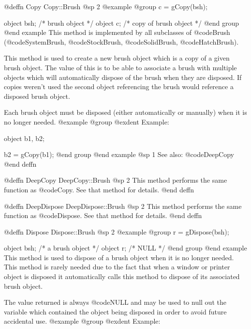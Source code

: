 @deffn {Copy} Copy::Brush
@sp 2
@example
@group
c = gCopy(bsh);

object  bsh;    /*  brush object          */
object  c;      /*  copy of brush object  */
@end group
@end example
This method is implemented by all subclasses of @code{Brush}
(@code{SystemBrush}, @code{StockBrush}, @code{SolidBrush},
@code{HatchBrush}).

This method is used to create a new brush object which is a copy of a
given brush object.  The value of this is to be able to associate a
brush with multiple objects which will automatically dispose of the
brush when they are disposed.  If copies weren't used the second object
referencing the brush would reference a disposed brush object.

Each brush object must be disposed (either automatically or manually)
when it is no longer needed.
@example
@group
@exdent Example:

object  b1, b2;

b2 = gCopy(b1);
@end group
@end example
@sp 1
See also:  @code{DeepCopy}
@end deffn









@deffn {DeepCopy} DeepCopy::Brush
@sp 2
This method performs the same function as @code{Copy}.  See that
method for details.
@end deffn





@deffn {DeepDispose} DeepDispose::Brush
@sp 2
This method performs the same function as @code{Dispose}.  See that
method for details.
@end deffn







@deffn {Dispose} Dispose::Brush
@sp 2
@example
@group
r = gDispose(bsh);

object  bsh;   /*  a brush object  */
object  r;     /*  NULL            */
@end group
@end example
This method is used to dispose of a brush object when it is no longer
needed.  This method is rarely needed due to the fact that when a window
or printer object is disposed it automatically calls this method to
dispose of its associated brush object.

The value returned is always @code{NULL} and may be used to null out
the variable which contained the object being disposed in order to
avoid future accidental use.
@example
@group
@exdent Example:

